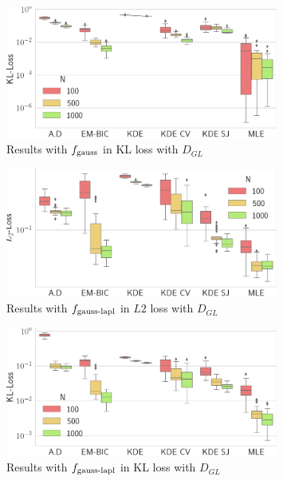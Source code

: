 \begin{figure}
\center
    \includegraphics[width=0.8\textwidth]{./TeX_files/res_gauss_KL_GL.png}
    \caption{Results with $f_{\textnormal{gauss}}$ in KL loss with $D_{GL}$}
    \label{fig:res_gauss_KL_GL}
\end{figure}   

\begin{figure}
\center
    \includegraphics[width=0.8\textwidth]{./TeX_files/res_lapl_gauss_L2_GL.png}
    \caption{Results with $f_{\textnormal{gauss-lapl}}$ in $L2$ loss with $D_{GL}$}
    \label{fig:res_lapl_gauss_L2_GL}
\end{figure}

\begin{figure}
\center
    \includegraphics[width=0.8\textwidth]{./TeX_files/res_lapl_gauss_KL_GL.png}
    \caption{Results with $f_{\textnormal{gauss-lapl}}$ in KL loss with $D_{GL}$}
    \label{fig:res_lapl_gauss_KL_GL}
\end{figure}
